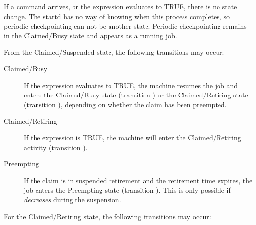 If a  command arrives,
or the  expression evaluates to TRUE,
there is no state change.
The startd has no way of knowing when this process completes,
so periodic checkpointing can not be another state.
Periodic checkpointing remains in the Claimed/Busy state
and appears as a running job.

From the Claimed/Suspended state, the following transitions
may occur:

\begin{description}
  
\item[Claimed/Busy] If the  expression evaluates to
  TRUE, the machine resumes the job and enters the
  Claimed/Busy state (transition ) or the Claimed/Retiring
  state (transition ), depending on whether the claim
  has been preempted.

\item[Claimed/Retiring] If the  expression is TRUE, the machine
  will enter the Claimed/Retiring activity (transition ).

\item[Preempting] If the claim is in suspended retirement and the
  retirement time expires, the job enters the Preempting state
  (transition ).  This is only possible if
   \emph{decreases} during the suspension.


\end{description}

For the Claimed/Retiring state, the following transitions may occur:


